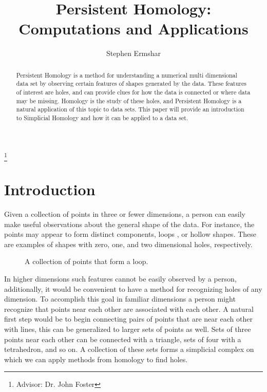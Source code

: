 

\title[Persistent Homology]{Persistent Homology: Computations and Applications}
\author{Stephen Ermshar}
\address{Walla Walla University}
\thanks{Advisor: Dr. John Foster}

\date{} %



\begin{abstract}
    Persistent Homology is a method for understanding a numerical multi dimensional data set by observing certain features of shapes generated by the data.
    These features of interest are holes, and can provide clues for how the data is connected or where data may be missing.
    Homology is the study of these holes, and Persistent Homology is a natural application of this topic to data sets.
    This paper will provide an introduction to Simplicial Homology and how it can be applied to a data set.
\end{abstract}
\maketitle

\section{Introduction}

Given a collection of points in three or fewer dimensions, a person can easily make useful observations about the general shape of the data.
For instance, the points may appear to form distinct components, loops , or hollow shapes.
These are examples of shapes with zero, one, and two dimensional holes, respectively.

\begin{figure}[h!]\label{fig:annulus}
    \centering
    
    \caption{A collection of points that form a loop.}
\end{figure}

In higher dimensions such features cannot be easily observed by a person, additionally, it would be convenient to have a method for recognizing holes of any dimension.
To accomplish this goal in familiar dimensions a person might recognize that points near each other are associated with each other.
A natural first step would be to begin connecting pairs of points that are near each other with lines, this can be generalized to larger sets of points as well.
Sets of three points near each other can be connected with a triangle, sets of four with a tetrahedron, and so on. A collection of these sets forms a simplicial complex on which we can apply methods from homology to find holes.

